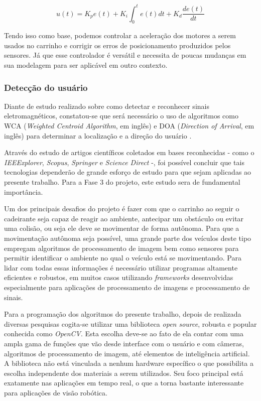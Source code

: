 $$
u(t)=K_p e(t)+K_i\int_0^t e(t) dt + K_d\frac{de(t)}{dt}
$$

Tendo isso como base, podemos controlar a aceleração dos motores a serem usados no carrinho e corrigir os erros de posicionamento produzidos pelos sensores. Já que esse controlador é versátil e necessita de poucas mudanças em sua modelagem para ser aplicável em outro contexto. \cite{wescott2000}

\subsubsection{Detecção do usuário}


\par Diante de estudo realizado sobre como detectar e reconhecer sinais eletromagnéticos, constatou-se que será necessário o uso de algoritmos como WCA (\textit{Weighted Centroid Algorithm}, em inglês) e DOA (\textit{Direction of Arrival}, em inglês) para determinar a localização e a direção do usuário \cite{min2015active}. 

Através do estudo de artigos científicos coletados em bases reconhecidas - como o \textit{IEEExplorer}, \textit{Scopus}, \textit{Springer} e \textit{Science Direct} -, foi possível concluir que tais tecnologias dependerão de grande esforço de estudo para que sejam aplicadas ao presente trabalho. Para a Fase 3 do projeto, este estudo sera de fundamental importância.


	Um dos principais desafios do projeto é fazer com que o carrinho ao seguir o cadeirante seja capaz de reagir ao ambiente, antecipar um obstáculo ou evitar uma colisão, ou seja ele deve se movimentar de forma autônoma. 
Para que a movimentação autônoma seja possível, uma grande parte dos veículos deste tipo empregam algoritmos de processamento de imagem bem como sensores para permitir identificar o ambiente no qual o veículo está se movimentando. Para lidar com todas essas informações é necessário utilizar programas altamente eficientes e robustos, em muitos casos utilizando \textit{frameworks} desenvolvidas especialmente para aplicações de processamento de imagens e processamento de sinais.
	
    Para a programação dos algoritmos do presente trabalho, depois de realizada diversas pesquisas cogita-se utilizar uma biblioteca \textit{open source}, robusta e popular conhecida como \textit{OpenCV}. Esta escolha deve-se ao fato de ela contar com uma ampla gama de funções que vão desde interface com o usuário e com câmeras, algoritmos de processamento de imagem, até elementos de inteligência artificial. A biblioteca não está vinculada a nenhum hardware específico o que possibilita a escolha independente dos materiais a serem utilizados. Seu foco principal está exatamente nas aplicações em tempo real, o que a torna bastante interessante para aplicações de visão robótica.
	
